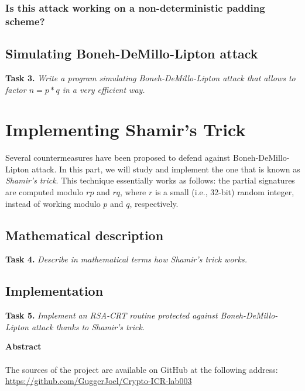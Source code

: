 \documentclass[a4paper]{report}
\begin{document}
\subsection{Is this attack working on a non-deterministic padding scheme?}

\section{Simulating Boneh-DeMillo-Lipton attack}
\textbf{Task 3.} \textit{Write a program simulating Boneh-DeMillo-Lipton attack that allows to factor $n = p*q$ in a very efficient way.}


\chapter{Implementing Shamir’s Trick}
Several countermeasures have been proposed to defend against Boneh-DeMillo-Lipton attack. In this part, we will study and implement the one that is known as \textit{Shamir’s trick}. This technique essentially works as follows: the partial signatures are computed modulo $rp$ and $rq$, where $r$ is a small (i.e., 32-bit) random integer, instead of working modulo $p$ and $q$, respectively.

\section{Mathematical description}
\textbf{Task 4.} \textit{Describe in mathematical terms how Shamir’s trick works.}

\section{Implementation}
\textbf{Task 5.} \textit{Implement an RSA-CRT routine protected against Boneh-DeMillo-Lipton attack thanks to Shamir’s trick.}


\newpage
\vspace*{6 cm}
\begin{center}
\textbf{Abstract} \\
\ \\
The sources of the project are available on GitHub at the following address: \\
\href{https://github.com/GuggerJoel/Crypto-ICR-lab003}{https://github.com/GuggerJoel/Crypto-ICR-lab003}
\end{center}
\end{document}
